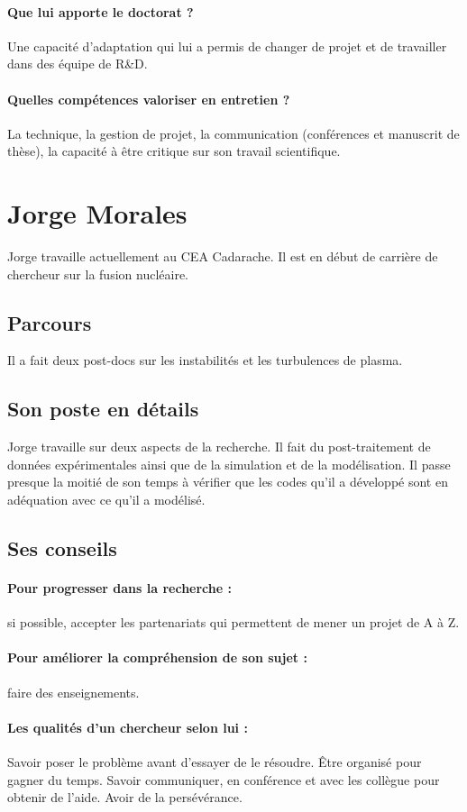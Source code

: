 \documentclass[12pt]{article}
\begin{document}
\paragraph{Que lui apporte le doctorat ?} Une capacité d'adaptation qui lui a permis de changer de projet et de travailler dans des équipe de R\&D.
\paragraph{Quelles compétences valoriser en entretien ?} La technique, la gestion de projet, la communication (conférences et manuscrit de thèse), la capacité à être critique sur son travail scientifique.


\section{Jorge Morales}
Jorge travaille actuellement au CEA Cadarache. Il est en début de carrière de chercheur sur la fusion nucléaire.

\subsection{Parcours}
Il a fait deux post-docs sur les instabilités et les turbulences de plasma.
\subsection{Son poste en détails}
Jorge travaille sur deux aspects de la recherche. Il fait du post-traitement de données expérimentales ainsi que de la simulation et de la modélisation. Il passe presque la moitié de son temps à vérifier que les codes qu'il a développé sont en adéquation avec ce qu'il a modélisé.
\subsection{Ses conseils}
\paragraph{Pour progresser dans la recherche : }si possible, accepter les partenariats qui permettent de mener un projet de A à Z.
\paragraph{Pour améliorer la compréhension de son sujet : } faire des enseignements.
\paragraph{Les qualités d'un chercheur selon lui : }Savoir poser le problème avant d'essayer de le résoudre. Être organisé pour gagner du temps. Savoir communiquer, en conférence et avec les collègue pour obtenir de l'aide. Avoir de la persévérance.
\end{document}
